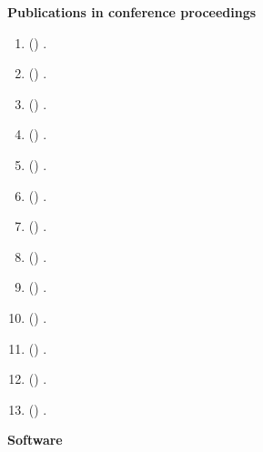 \vspace{1em}

\noindent
\textbf{Publications in conference proceedings}

\vspace{1em}

\begin{enumerate}
\footnotesize
	\item (\cite{Galaz2018a}) .
	\item (\cite{Mucha2018a}) .
	\item (\cite{Harar2017}) .
	\item (\cite{Mucha2017b}) .
	\item (\cite{Galaz2017d}) .
	\item (\cite{Galaz2017b}) .
	\item (\cite{Galaz2017a}) .
	\item (\cite{Galaz2016d}) .
	\item (\cite{Galaz2016c}) .
	\item (\cite{Galaz2016b}) .
	\newpage
	\item (\cite{Smekal2015a}) .
	\item (\cite{Smekal2015c}) .
	\item (\cite{Galaz2015}) .
\end{enumerate}

\vspace{1em}

\noindent
\textbf{Software}

\vspace{1em}

